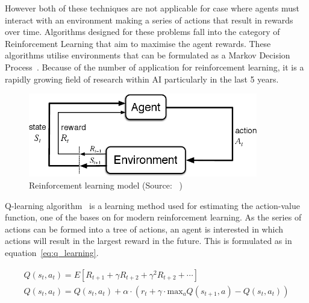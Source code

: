 However both of these techniques are not applicable for case where agents must interact with an environment making a
series of actions that result in rewards over time. Algorithms designed for these problems fall into the category of
Reinforcement Learning that aim to maximise the agent rewards. These algorithms utilise environments that can be
formulated as a Markov Decision Process~\citep{Bel}. Because of the number of application for reinforcement learning,
it is a rapidly growing field of research within AI particularly in the last 5 years.


\begin{figure}[h]
    \includegraphics[width=10cm]{figures/reinforcement_learning.png}
    \caption{Reinforcement learning model (Source: ~\cite{Sutton1998})}
    \label{fig:reinforcement_learning}
\end{figure}


Q-learning algorithm~\cite{watkins1992q-learning} is a learning method used for estimating the action-value function,
one of the bases on for modern reinforcement learning. As the series of actions can be formed into a tree of
actions, an agent is interested in which actions will result in the largest reward in the future. This is formulated
as in equation~\eqref{eq:q_learning}.

\begin{align}
    Q(s_t, a_t) = E[R_{t+1} + \gamma R_{t+2} + \gamma^2 R_{t+2} + \cdots ] \label{eq:q_value} \\
    Q(s_t, a_t) = Q(s_t, a_t) + \alpha \cdot (r_t + \gamma \cdot \text{max}_a Q(s_{t+1} , a) - Q(s_t, a_t) ) \label{eq:q_learning} \\
\end{align}

